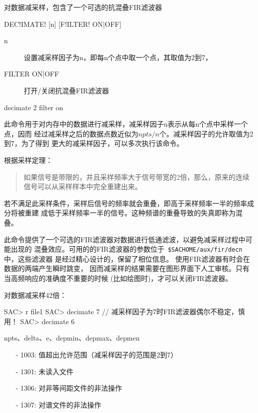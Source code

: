 \label{cmd:decimate}

对数据减采样，包含了一个可选的抗混叠FIR滤波器

\begin{SACSTX}
DEC!IMATE! [n] [F!ILTER! ON|OFF]
\end{SACSTX}

\begin{description}
\item [n] 设置减采样因子为n，即每n个点中取一个点，其取值为2到7，
\item [FILTER ON|OFF] 打开/关闭抗混叠FIR滤波器
\end{description}

\begin{SACDFT}
decimate 2 filter on
\end{SACDFT}

此命令用于对内存中的数据进行减采样，减采样因子n表示从每n个点中采样一个点，因而
经过减采样之后的数据点数近似为$npts/n$个。减采样因子的允许取值为2到7，为了得到
更大的减采样因子，可以多次执行该命令。

根据采样定理：
\begin{quote}
如果信号是带限的，并且采样频率大于信号带宽的2倍，那么，原来的连续信号可以从采样样本中完全重建出来。
\end{quote}
若不满足此采样条件，采样后信号的频率就会重叠，即高于采样频率一半的频率成分将被重建
成低于采样频率一半的信号。这种频谱的重叠导致的失真即称为混叠。

此命令提供了一个可选的FIR滤波器对数据进行低通滤波，以避免减采样过程中可能出现的
混叠效应。可用的的FIR滤波器的参数位于~\verb+$SACHOME/aux/fir/decn+中，这些滤波器
是经过精心设计的，保留了相位信息。
使用FIR滤波器有时会在数据的两端产生瞬时跳变，
因而减采样的结果需要在图形界面下人工审核。只有当高频响应的准确度不重要的时候
(比如绘图时)，才可以关闭FIR滤波器。

对数据减采样42倍：
\begin{SACCode}
SAC> r file1
SAC> decimate 7     // 减采样因子为7时FIR滤波器偶尔不稳定，慎用！
SAC> decimate 6
\end{SACCode}

npts、delta、e、depmin、depmax、depmen

\begin{itemize}
\item[-]1003: 值超出允许范围（减采样因子的范围是2到7）
\item[-]1301: 未读入文件
\item[-]1306: 对非等间距文件的非法操作
\item[-]1307: 对谱文件的非法操作
\end{itemize}
